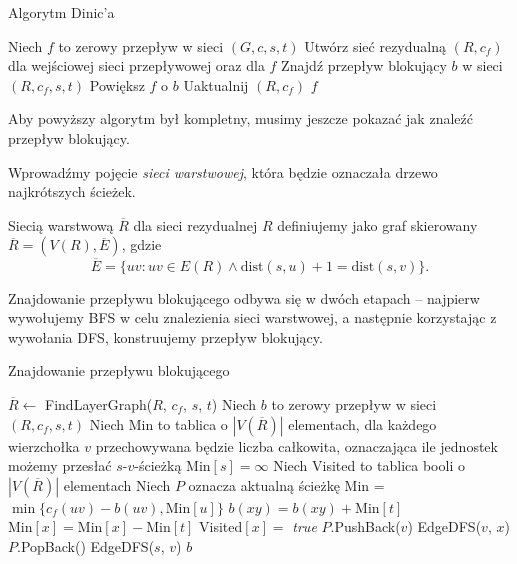\begin{algorithm}[H]
	\caption{Algorytm Dinic'a}
	\begin{algorithmic}[1]
		\State Niech $f$ to zerowy przepływ w sieci $(G,c,s,t)$
		\State Utwórz sieć rezydualną $(R, c_f)$ dla wejściowej 
		sieci przepływowej oraz dla $f$ 
		\State Znajdź przepływ blokujący $b$ w sieci $(R, c_f, s, t)$
		\State Powiększ $f$ o $b$
		\State Uaktualnij $(R, c_f)$
		\EndWhile
		\State \Return $f$
		\EndProcedure
	\end{algorithmic}
	\label{dinic_alg}
\end{algorithm}

Aby powyższy algorytm był kompletny, musimy jeszcze pokazać jak znaleźć przepływ blokujący.

Wprowadźmy pojęcie \textit{sieci warstwowej}, która będzie
oznaczała drzewo najkrótszych ścieżek.
\begin{defi}
	Siecią warstwową $\overline{R}$ dla sieci rezydualnej $R$
	definiujemy jako graf skierowany $\overline{R} = (V(R), \overline{E})$, gdzie
	\[\overline{E}=\{uv : uv \in E(R) \land \text{dist}(s, u)  + 1 = \text{dist}(s, v)\}.\]
\end{defi}

Znajdowanie przepływu blokującego odbywa się w dwóch etapach -- najpierw
wywołujemy BFS w celu znalezienia sieci warstwowej,
a następnie korzystając z wywołania DFS, konstruujemy
przepływ blokujący.

\begin{algorithm}[H]
	\caption{Znajdowanie przepływu blokującego}
	\begin{algorithmic}[1]
		\State $\overline{R} \gets$ FindLayerGraph($R$, $c_f$, $s$, $t$)
		\State Niech $b$ to zerowy przepływ w sieci $(R, c_f, s, t)$
		\State Niech Min to tablica o $|V(\overline{R})|$ elementach, 
		dla każdego wierzchołka $v$ przechowywana będzie liczba całkowita,
		oznaczająca ile jednostek możemy przesłać $s$-$v$-ścieżką 
		\State Min$[s] = \infty$
		\State Niech Visited to tablica booli o $|V(\overline{R})|$ elementach
		\State Niech $P$ oznacza aktualną ścieżkę
		\State Min = $\min\{c_f(uv) - b(uv), \text{Min}[u]\}$
		\State $b(xy) = b(xy) + \text{Min}[t]$
		\State $\text{Min}[x] = \text{Min}[x] - \text{Min}[t]$
		\EndFor
		\EndIf
		\State Visited$[x]=$ \textit{true} 
		\State $P$.PushBack($v$)
		\State EdgeDFS($v$, $x$)
		\State $P$.PopBack()
		\EndIf
		\EndFor
		\EndProcedure
		\State EdgeDFS($s$, $v$)
		\EndFor
		\State \Return $b$
		\EndProcedure
	\end{algorithmic}
	\label{blocking_flow_alg}
\end{algorithm}

